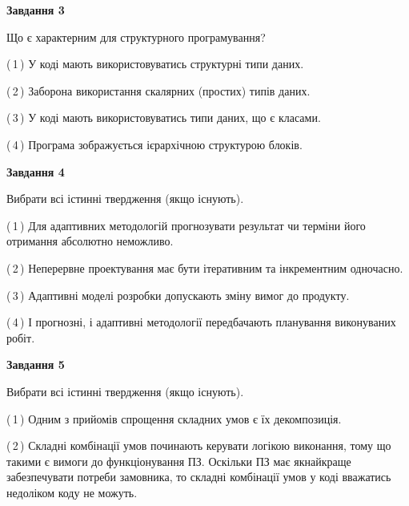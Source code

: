 \documentclass[10pt, ukrainian]{article}
\begin{document}
{\begin {large}
{\begin {center}\textbf{Завдання 3}\end {center}}\par
Що є характерним для структурного програмування?\par
\vspace{2mm}



(\,1\,) У коді мають використовуватись структурні типи даних. %



(\,2\,) Заборона використання скалярних (простих) типів даних. %



(\,3\,) У коді мають використовуватись типи даних, що є класами. %



(\,4\,) Програма зображується ієрархічною структурою блоків.%


{\begin {center}\textbf{Завдання 4}\end {center}}\par
Вибрати всі істинні твердження (якщо існують).\par
\vspace{2mm}



(\,1\,) Для адаптивних методологій прогнозувати результат чи терміни його отримання абсолютно неможливо. %



(\,2\,) Неперервне проектування має бути ітеративним та інкрементним одночасно. %



(\,3\,) Адаптивні моделі розробки допускають зміну вимог до продукту. %



(\,4\,) І прогнозні, і адаптивні методології передбачають планування виконуваних робіт. %


{\begin {center}\textbf{Завдання 5}\end {center}}\par
Вибрати всі істинні твердження (якщо існують).\par
\vspace{2mm}



(\,1\,) Одним з прийомів спрощення складних умов є їх декомпозиція. %



(\,2\,) Складні комбінації умов починають керувати логікою виконання, тому що такими є вимоги до функціонування ПЗ. Оскільки ПЗ має якнайкраще забезпечувати потреби замовника, то складні комбінації умов у коді вважатись недоліком коду не можуть. %




\end{large}}
\end{document}

